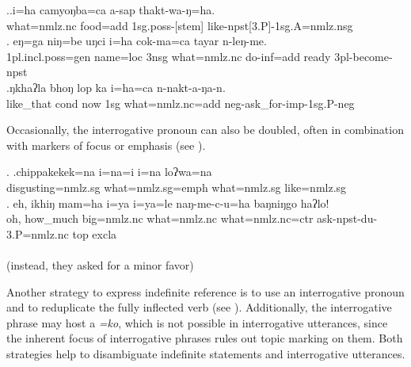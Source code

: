 \ex.\ag.i=ha camyoŋba=ca a-sap thakt-wa-ŋ=ha.\\
what{\sc =nmlz.nc} food{\sc =add} {\sc 1sg.poss-[stem]} like{\sc-npst[3.P]-1sg.A=nmlz.nsg}\\
\bg. eŋ=ga              niŋ=be    uŋci i=ha            cok-ma=ca            tayar  n-leŋ-me.\\
{\sc 1pl.incl.poss=gen} name{\sc =loc} {\sc 3nsg} what{\sc =nmlz.nc} do{\sc -inf=add} ready {\sc 3pl-}become{\sc -npst}\\
 
\bg.ŋkhaʔla bhoŋ     lop ka  i=ha=ca                       n-nakt-a-ŋa-n.\\
like\_that {\sc cond} now {\sc 1sg} what{\sc =nmlz.nc=add} {\sc neg-}ask\_for{\sc -imp-1sg.P-neg}\\
  

Occasionally, the interrogative pronoun can also be doubled, often in combination with markers of focus or emphasis (see \Next).

\ex. \ag.chippakekek=na         i=na=i                i=na           loʔwa=na\\
disgusting{\sc =nmlz.sg} what{\sc =nmlz.sg=emph} what{\sc =nmlz.sg} like{\sc =nmlz.sg}\\
 
\bg. eh,    ikhiŋ   mam=ha i=ya i=ya=le                         naŋ-me-c-u=ha baŋniŋgo     haʔlo!\\
 oh, how\_much big{\sc =nmlz.nc} what{\sc =nmlz.nc} what{\sc =nmlz.nc=ctr} ask{\sc -npst-du-3.P=nmlz.nc} {\sc top} {\sc excla}\\
 \\
 (instead, they asked for a minor favor) 
 
 
Another strategy to express indefinite reference is to use an interrogative pronoun and to reduplicate  the fully inflected verb (see \Next). Additionally, the interrogative phrase may host a  \emph{=ko}, which is not possible in interrogative utterances, since the inherent focus of interrogative phrases rules out topic marking on them. Both strategies help to disambiguate indefinite statements and interrogative utterances.

